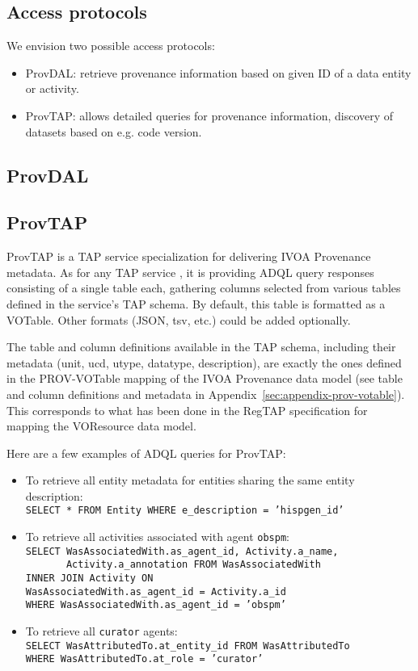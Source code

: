 \subsection{Access protocols}
\label{sec:access_protocols}
We envision two possible access protocols:
\begin{itemize}
\item ProvDAL: retrieve provenance information based on given ID of a data entity or activity.
\item ProvTAP: allows detailed queries for provenance information, discovery of datasets based on e.g. code version.
\end{itemize}

\subsection{ProvDAL}



\subsection{ProvTAP}
ProvTAP is a TAP service specialization for delivering IVOA Provenance metadata.
As for any TAP service \citep{std:TAP}, it is providing ADQL query responses
consisting of a single table each, gathering columns selected from various
tables defined in the service's TAP schema. By default, this table is formatted
as a VOTable. Other formats (JSON, tsv, etc.) could be added optionally.

The table and column definitions available in the TAP schema, including their
metadata (\attribute unit, \attribute ucd, \attribute utype, \attribute datatype, description), are exactly the ones defined
in the PROV-VOTable mapping of the IVOA Provenance data model (see table and
column definitions and metadata in Appendix~\ref{sec:appendix-prov-votable}).
This corresponds to what has been done in the RegTAP specification
\citep{std:RegTAP} for mapping the VOResource data model.

Here are a few examples of ADQL queries for ProvTAP:
\begin{itemize}
\item To retrieve all entity metadata for entities sharing the same entity description: \\
\texttt{SELECT * FROM  Entity WHERE e\_description = 'hispgen\_id'}
\item To retrieve all activities associated with agent \texttt{obspm}: \\
\texttt{SELECT WasAssociatedWith.as\_agent\_id, Activity.a\_name, \\}
\verb!       !\texttt{Activity.a\_annotation FROM WasAssociatedWith \\
INNER JOIN Activity ON \\ WasAssociatedWith.as\_agent\_id = Activity.a\_id 
\\ WHERE  WasAssociatedWith.as\_agent\_id = 'obspm'}
\item To retrieve all \texttt{curator} agents: \\
\texttt{SELECT  WasAttributedTo.at\_entity\_id FROM WasAttributedTo \\
 WHERE WasAttributedTo.at\_role = 'curator'}
\end{itemize}

